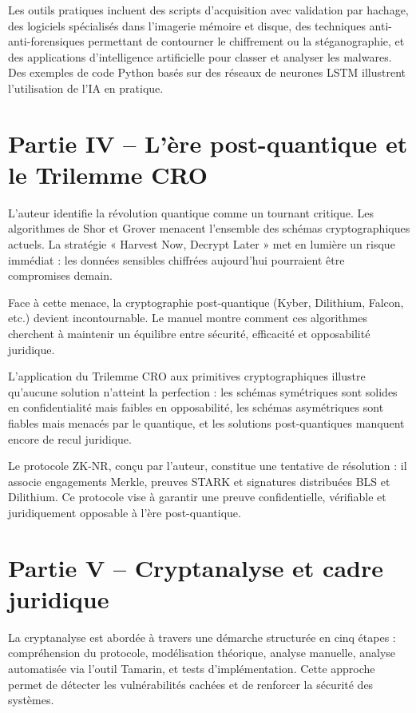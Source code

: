 \documentclass[12pt, a4paper]{article}
\begin{document}
\begin{Large}
\begin{Large}
Les outils pratiques incluent des scripts d'acquisition avec validation par hachage, des logiciels spécialisés dans l'imagerie mémoire et disque, des techniques anti-anti-forensiques permettant de contourner le chiffrement ou la stéganographie, et des applications d'intelligence artificielle pour classer et analyser les malwares. Des exemples de code Python basés sur des réseaux de neurones LSTM illustrent l'utilisation de l'IA en pratique.

\section*{Partie IV -- L'ère post-quantique et le Trilemme CRO}

L'auteur identifie la révolution quantique comme un tournant critique. Les algorithmes de Shor et Grover menacent l'ensemble des schémas cryptographiques actuels. La stratégie « Harvest Now, Decrypt Later » met en lumière un risque immédiat : les données sensibles chiffrées aujourd'hui pourraient être compromises demain.

Face à cette menace, la cryptographie post-quantique (Kyber, Dilithium, Falcon, etc.) devient incontournable. Le manuel montre comment ces algorithmes cherchent à maintenir un équilibre entre sécurité, efficacité et opposabilité juridique.

L'application du Trilemme CRO aux primitives cryptographiques illustre qu'aucune solution n'atteint la perfection : les schémas symétriques sont solides en confidentialité mais faibles en opposabilité, les schémas asymétriques sont fiables mais menacés par le quantique, et les solutions post-quantiques manquent encore de recul juridique.

Le protocole ZK-NR, conçu par l'auteur, constitue une tentative de résolution : il associe engagements Merkle, preuves STARK et signatures distribuées BLS et Dilithium. Ce protocole vise à garantir une preuve confidentielle, vérifiable et juridiquement opposable à l'ère post-quantique.

\section*{Partie V -- Cryptanalyse et cadre juridique}

La cryptanalyse est abordée à travers une démarche structurée en cinq étapes : compréhension du protocole, modélisation théorique, analyse manuelle, analyse automatisée via l'outil Tamarin, et tests d'implémentation. Cette approche permet de détecter les vulnérabilités cachées et de renforcer la sécurité des systèmes.


\end{Large}
\end{Large}
\end{document}
